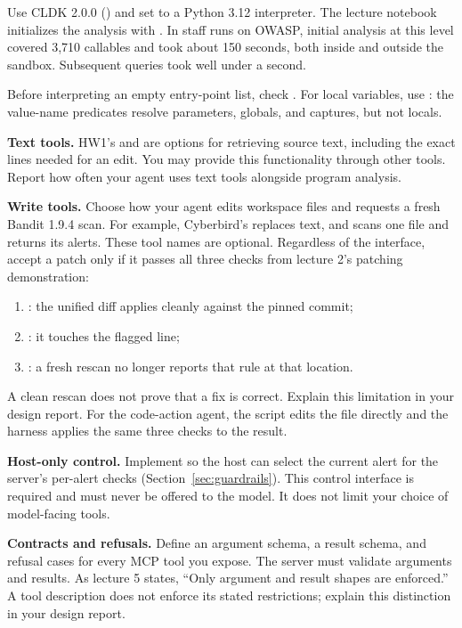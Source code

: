 \documentclass[9pt,letterpaper]{article}
\begin{document}
Use CLDK 2.0.0 () and set  to a Python 3.12
interpreter. The lecture notebook initializes the analysis with
 .
In staff runs on OWASP, initial analysis at this level covered 3,710 callables and
took about 150 seconds, both inside and outside the sandbox. Subsequent queries
took well under a second.

Before interpreting an empty entry-point list, check
. For local variables, use : the
value-name predicates resolve parameters, globals, and captures, but not locals.

\textbf{Text tools.} HW1's  and  are options for
retrieving source text, including the exact lines needed for an edit. You may
provide this functionality through other tools. Report how often your agent uses
text tools alongside program analysis.

\textbf{Write tools.} Choose how your agent edits workspace files and requests a
fresh Bandit 1.9.4 scan. For example, Cyberbird's 
replaces text, and  scans one file and returns its alerts.
These tool names are optional. Regardless of the interface, accept a patch only
if it passes all three checks from lecture 2's patching demonstration:
\begin{enumerate}
\item {}: the unified diff applies cleanly against the pinned commit;
\item {}: it touches the flagged line;
\item {}: a fresh rescan no longer reports that rule at that location.
\end{enumerate}
A clean rescan does not prove that a fix is correct. Explain this limitation in
your design report. For the code-action agent, the script edits the file directly
and the harness applies the same three checks to the result.

\textbf{Host-only control.} Implement  so the host can
select the current alert for the server's per-alert checks
(Section~\ref{sec:guardrails}). This control interface is required and must never
be offered to the model. It does not limit your choice of model-facing tools.

\textbf{Contracts and refusals.} Define an argument schema, a result schema, and
refusal cases for every MCP tool you expose. The server must validate arguments
and results.
As lecture 5 states, ``Only argument and result shapes are enforced.'' A tool
description does not enforce its stated restrictions; explain this distinction
in your design report.
\end{document}
